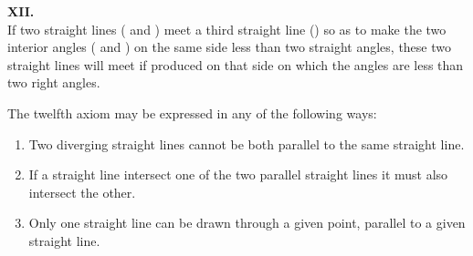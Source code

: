 \documentclass[12pt]{article}
\begin{document}
\vspace{0.5cm}
\noindent
\begin{minipage}[t]{0.34\linewidth}
  \vspace{0pt}\centering
  \drawCurrentPicture
\end{minipage}\hfill
\begin{minipage}[t]{0.62\linewidth}
  \vspace{0pt}\centering
  \textbf{XII.}\\[5pt]
  If two straight lines
  ( and )
  meet a third straight line ()
  so as to make the two interior angles
  ( and )
  on the same side less than two straight angles,
  these two straight lines will meet if produced
  on that side on which the angles are less than
  two right angles.\\[8pt]
  \raggedright
  The twelfth axiom may be expressed in any of the
  following ways:
  \begin{enumerate}[leftmargin=*, topsep=2pt, itemsep=2pt]
    \item Two diverging straight lines cannot be both
          parallel to the same straight line.
    \item If a straight line intersect one of the two
          parallel straight lines it must also intersect
          the other.
    \item Only one straight line can be drawn through a
          given point, parallel to a given straight line.
  \end{enumerate}
\end{minipage}
\end{document}
